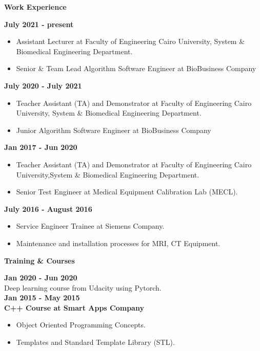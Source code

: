 \documentclass[a4paper,12pt,final]{memoir}
\newcommand{\Sep}{\vspace{1.5em}}
\newcommand{\SmallSep}{\vspace{0.5em}}
\newcommand{\CVSection}[1]
	{\Large\textbf{#1}\par
	\SmallSep\normalsize\normalfont}
\newcommand{\CVItem}[1]
	{\textbf{\color{RoyalBlue} #1}}
\begin{document}
\CVSection{Work Experience}
\CVItem{July 2021 - present}\\
\begin{itemize}
  \item Assistant Lecturer at Faculty of Engineering Cairo University, System \& Biomedical Engineering Department.
  \item Senior \& Team Lead Algorithm Software Engineer at BioBusiness Company
\end{itemize}
\SmallSep
\CVItem{July 2020 - July 2021}\\
\begin{itemize}
  \item Teacher Assistant (TA) and Demonstrator at Faculty of Engineering Cairo University, System \& Biomedical Engineering Department.
  \item Junior Algorithm Software Engineer at BioBusiness Company
\end{itemize}
\SmallSep
\CVItem{Jan 2017 - Jun 2020}\\
\begin{itemize}
  \item Teacher Assistant (TA) and Demonstrator at Faculty of Engineering Cairo University,System \& Biomedical Engineering Department.
  \item Senior Test Engineer at Medical Equipment Calibration Lab (MECL).
\end{itemize}
\SmallSep

\CVItem{July 2016 - August 2016}\\
\begin{itemize}
  \item Service Engineer Trainee at Siemens Company.
  \item Maintenance and installation processes for MRI, CT Equipment.
\end{itemize}
\Sep


\clearpage
\framebreak
\framebreak
\CVSection{Training \& Courses}
\CVItem{Jan 2020 - Jun 2020}\\
Deep learning course from Udacity using Pytorch.\\

\CVItem{Jan 2015 - May 2015}\\
\CVItem{C++ Course at Smart Apps Company}
\begin{itemize}
  \item Object Oriented Programming Concepts.
  \item Templates and Standard Template Library (STL).
\end{itemize}
\end{document}
